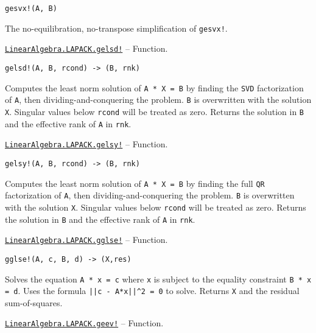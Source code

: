 \begin{adjustwidth}{2em}{0pt}
\begin{lstlisting}
gesvx!(A, B)
\end{lstlisting}

The no-equilibration, no-transpose simplification of \texttt{gesvx!}.



\end{adjustwidth}
\hypertarget{9350383558985209547}{}
\hyperlink{9350383558985209547}{\texttt{LinearAlgebra.LAPACK.gelsd!}}  -- {Function.}

\begin{adjustwidth}{2em}{0pt}


\begin{verbatim}
gelsd!(A, B, rcond) -> (B, rnk)
\end{verbatim}

Computes the least norm solution of \texttt{A * X = B} by finding the \texttt{SVD} factorization of \texttt{A}, then dividing-and-conquering the problem. \texttt{B} is overwritten with the solution \texttt{X}. Singular values below \texttt{rcond} will be treated as zero. Returns the solution in \texttt{B} and the effective rank of \texttt{A} in \texttt{rnk}.



\end{adjustwidth}
\hypertarget{4643805579678817866}{}
\hyperlink{4643805579678817866}{\texttt{LinearAlgebra.LAPACK.gelsy!}}  -- {Function.}

\begin{adjustwidth}{2em}{0pt}


\begin{verbatim}
gelsy!(A, B, rcond) -> (B, rnk)
\end{verbatim}

Computes the least norm solution of \texttt{A * X = B} by finding the full \texttt{QR} factorization of \texttt{A}, then dividing-and-conquering the problem. \texttt{B} is overwritten with the solution \texttt{X}. Singular values below \texttt{rcond} will be treated as zero. Returns the solution in \texttt{B} and the effective rank of \texttt{A} in \texttt{rnk}.



\end{adjustwidth}
\hypertarget{6779153008628150661}{}
\hyperlink{6779153008628150661}{\texttt{LinearAlgebra.LAPACK.gglse!}}  -- {Function.}

\begin{adjustwidth}{2em}{0pt}


\begin{verbatim}
gglse!(A, c, B, d) -> (X,res)
\end{verbatim}

Solves the equation \texttt{A * x = c} where \texttt{x} is subject to the equality constraint \texttt{B * x = d}. Uses the formula \texttt{||c - A*x||{\textasciicircum}2 = 0} to solve. Returns \texttt{X} and the residual sum-of-squares.



\end{adjustwidth}
\hypertarget{6944763016389470144}{}
\hyperlink{6944763016389470144}{\texttt{LinearAlgebra.LAPACK.geev!}}  -- {Function.}

